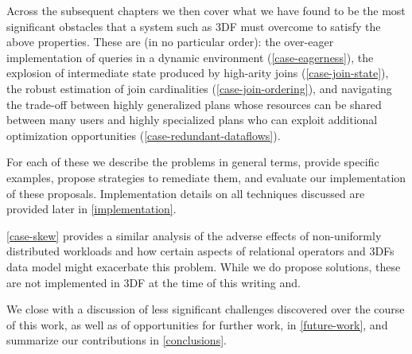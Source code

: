 \documentclass[../index.tex]{subfiles}
\begin{document}
Across the subsequent chapters we then cover what we have found to be
the most significant obstacles that a system such as 3DF must overcome
to satisfy the above properties. These are (in no particular order):
the over-eager implementation of queries in a dynamic environment
(\autoref{case-eagerness}), the explosion of intermediate state
produced by high-arity joins (\autoref{case-join-state}), the robust
estimation of join cardinalities (\autoref{case-join-ordering}), and
navigating the trade-off between highly generalized plans whose
resources can be shared between many users and highly specialized
plans who can exploit additional optimization opportunities
(\autoref{case-redundant-dataflows}).

For each of these we describe the problems in general terms, provide
specific examples, propose strategies to remediate them, and evaluate
our implementation of these proposals. Implementation details on all
techniques discussed are provided later in \autoref{implementation}.

\autoref{case-skew} provides a similar analysis of the adverse effects
of non-uniformly distributed workloads and how certain aspects of
relational operators and 3DFs data model might exacerbate this
problem. While we do propose solutions, these are not implemented in
3DF at the time of this writing and.

We close with a discussion of less significant challenges discovered
over the course of this work, as well as of opportunities for further
work, in \autoref{future-work}, and summarize our contributions in
\autoref{conclusions}.
\end{document}
